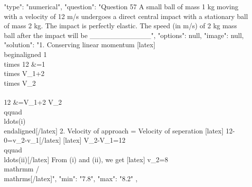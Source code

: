   {
    "type": "numerical",
    "question": "Question 57 A small ball of mass 1 kg moving with a velocity of 12 m/s undergoes a direct central impact with a stationary ball of mass 2 kg. The impact is perfectly elastic. The speed (in m/s) of 2 kg mass ball after the impact will be ____________",
    "options": null,
    "image": null,
    "solution": "1. Conserving linear momentum [latex] \\begin{aligned} 1 \\times 12 &=1 \\times V_{1}+2 \\times V_{2} \\\\ 12 &=V_{1}+2 V_{2}\\qquad \\ldots(i) \\end{aligned}[/latex] 2. Velocity of approach = Velocity of seperation [latex] 12-0=v_{2}-v_{1}[/latex] [latex] V_{2}-V_{1}=12 \\qquad \\ldots(ii)[/latex] From (i) and (ii), we get [latex] v_{2}=8 \\mathrm{m} / \\mathrm{s}[/latex]",
    "min": "7.8",
    "max": "8.2"
  },
